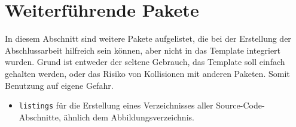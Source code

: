 %
\section{Weiterführende Pakete}\label{sec:addPackages}
In diesem Abschnitt sind weitere Pakete aufgelistet, die bei der Erstellung der Abschlussarbeit hilfreich sein können, aber nicht in das Template integriert wurden. Grund ist entweder der seltene Gebrauch, das Template soll einfach gehalten werden, oder das Risiko von Kollisionen mit anderen Paketen. Somit Benutzung auf eigene Gefahr.

\begin{itemize}
\item \texttt{listings} für die Erstellung eines Verzeichnisses aller Source-Code-Ab\-schnit\-te, ähnlich dem Abbildungsverzeichnis.
\end{itemize}
